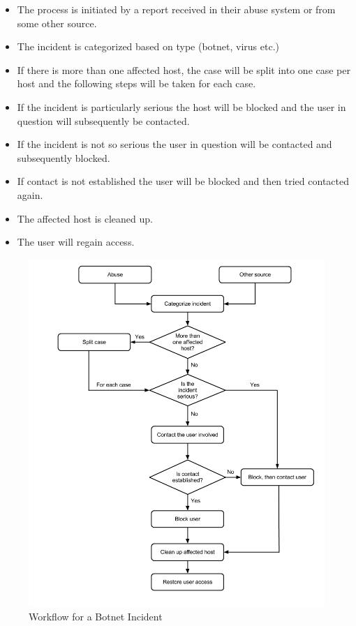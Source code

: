 \begin{itemize}\itemsep-0.2cm
\item The process is initiated by a report received in their abuse system or from some other source. 
\item The incident is categorized based on type (botnet, virus etc.)
\item If there is more than one affected host, the case will be split into one case per host and the following steps will be taken for each case.
\item If the incident is particularly serious the host will be blocked and the user in question will subsequently be contacted.
\item If the incident is not so serious the user in question will be contacted and subsequently blocked.
\item If contact is not established the user will be blocked and then tried contacted again.
\item The affected host is cleaned up.
\item The user will regain access.
\end{itemize}

\begin{figure}[H]
\hspace{-1.1cm}\includegraphics[scale=0.53]{WorkflowCaseABotnet.png}
\caption[Workflow for a Botnet Incident, Case B]{Workflow for a Botnet Incident}
\label{fig:WorkflowCaseABotnet}
\end{figure}


